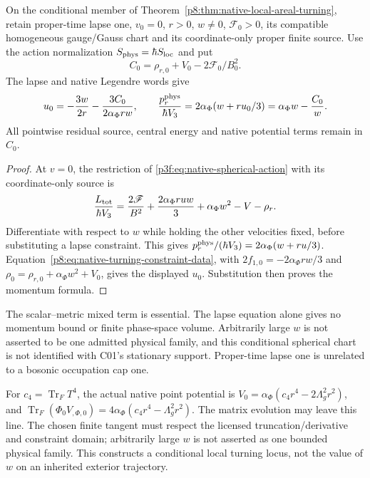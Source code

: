 \documentclass[12pt,a4paper]{article}
\begin{document}

\begin{corollary}
\label{p8:cor:v2174-native-turning-momentum}
On the conditional member of
Theorem~\ref{p8:thm:native-local-areal-turning}, retain proper-time lapse
one, $v_0=0$, $r>0$, $w\ne0$, $\mathscr F_0>0$, its compatible
homogeneous gauge/Gauss chart and its coordinate-only proper finite source.
Use the action normalization $S_{\rm phys}=\hbar S_{\rm loc}$ and put
\[
 C_0=\rho_{r,0}+V_0-2\mathscr F_0/B_0^2.
\]
The lapse and native Legendre words give
\begin{equation}
 u_0=-\frac{3w}{2r}-\frac{3C_0}{2\alpha_\Phi rw},\qquad
 \frac{p_r^{\rm phys}}{\hbar V_3}
        =2\alpha_\Phi(w+ru_0/3)
        =\alpha_\Phi w-\frac{C_0}{w}.
 \label{p8:eq:v2174-native-turning-momentum}
\end{equation}
All pointwise residual source, central energy and native potential terms
remain in $C_0$.
\end{corollary}
\begin{proof}
At $v=0$, the restriction of
\eqref{p3f:eq:native-spherical-action} with its coordinate-only source is
\[
 \frac{L_{\rm tot}}{\hbar V_3}
 =\frac{2\mathscr F}{B^2}
       +\frac{2\alpha_\Phi ruw}{3}+\alpha_\Phi w^2-V-\rho_r.
\]
Differentiate with respect to $w$ while holding the other velocities fixed,
before substituting a lapse constraint. This gives
$p_r^{\rm phys}/(\hbar V_3)=2\alpha_\Phi(w+ru/3)$.
Equation~\eqref{p8:eq:native-turning-constraint-data}, with
$2f_{1,0}=-2\alpha_\Phi rw/3$ and
$\rho_0=\rho_{r,0}+\alpha_\Phi w^2+V_0$, gives the displayed $u_0$.
Substitution then proves the momentum formula.
\end{proof}
The scalar--metric mixed term is essential. The lapse equation alone gives
no momentum bound or finite phase-space volume. Arbitrarily large $w$ is
not asserted to be one admitted physical family, and this conditional
spherical chart is not identified with C01's stationary support.
Proper-time lapse one is unrelated to a bosonic occupation cap one.



For \(c_4=\operatorname{Tr}_F T^4\), the actual native point potential is
\(V_0=\alpha_\Phi(c_4r^4-2\Lambda_g^2r^2)\), and
\(\operatorname{Tr}_F(\Phi_0V_{,\Phi,0})
=4\alpha_\Phi(c_4r^4-\Lambda_g^2r^2)\).
The matrix evolution may leave this line. The chosen finite tangent must
respect the licensed truncation/derivative and constraint domain; arbitrarily
large \(w\) is not asserted as one bounded physical family. This constructs
a conditional local turning locus, not the value of \(w\) on an inherited
exterior trajectory.
\end{document}
